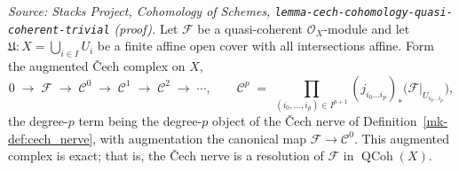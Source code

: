 \begin{lemma}\label{mk-lem:cech_augmented_resolution}
  \leanok

  \textit{Source: Stacks Project, Cohomology of Schemes,
  \texttt{lemma-cech-cohomology-quasi-coherent-trivial} (proof).}
  Let \(\mathcal{F}\) be a quasi-coherent \(\mathcal{O}_X\)-module and let
  \(\mathfrak{U} : X = \bigcup_{i \in I} U_i\) be a finite affine open cover with all
  intersections affine. Form the augmented {\v C}ech complex on \(X\),
  \[
    0 \;\to\; \mathcal{F} \;\to\; \mathcal{C}^0 \;\to\; \mathcal{C}^1 \;\to\;
    \mathcal{C}^2 \;\to\; \cdots,
    \qquad
    \mathcal{C}^p \;=\; \prod_{(i_0, \ldots, i_p) \in I^{p+1}}
      (j_{i_0 \ldots i_p})_*\bigl(\mathcal{F}|_{U_{i_0 \ldots i_p}}\bigr),
  \]
  the degree-\(p\) term being the degree-\(p\) object of the {\v C}ech nerve of
  Definition~\ref{mk-def:cech_nerve}, with augmentation the canonical map
  \(\mathcal{F} \to \mathcal{C}^0\). This augmented complex is exact; that is, the
  {\v C}ech nerve is a resolution of \(\mathcal{F}\) in \(\operatorname{QCoh}(X)\).
\end{lemma}
